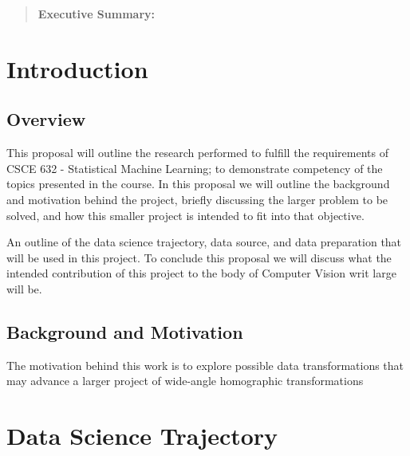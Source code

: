 \documentclass[sigplan,nonacm]{acmart}
\begin{document}
\title{}

\author{Brandon Hosley}

\begin{abstract}
	\textbf{Executive Summary:} 

\end{abstract}

\received{\today}
\maketitle

\section{Introduction}
\subsection{Overview}

This proposal will outline the research performed to fulfill the requirements of 
CSCE 632 - Statistical Machine Learning; 
to demonstrate competency of the topics presented in the course.
In this proposal we will outline the background and motivation behind the project,
briefly discussing the larger problem to be solved, and how this smaller project
is intended to fit into that objective.

An outline of the data science trajectory, data source, and data preparation that
will be used in this project.
To conclude this proposal we will discuss what the intended contribution of this project
to the body of Computer Vision writ large will be.


\subsection{Background and Motivation}

The motivation behind this work is to explore possible data transformations that may
advance a larger project of wide-angle homographic transformations

\section{Data Science Trajectory}
\end{document}
